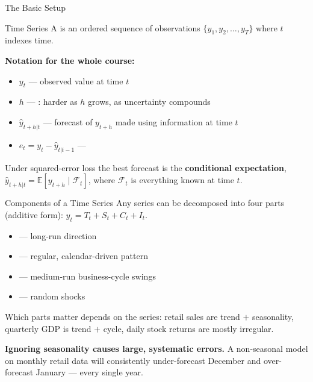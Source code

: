 \documentclass[aspectratio=169, 11pt]{beamer}
\begin{document}
\begin{frame}{The Basic Setup}
  \begin{definitionbox}{Time Series}
    A  is an ordered sequence of observations
    $\{y_1, y_2, \ldots, y_T\}$ where $t$ indexes time.
  \end{definitionbox}
  \textbf{Notation for the whole course:}
  \begin{itemize}\small\itemsep1pt
    \item $y_t$ --- observed value at time $t$
    \item $h$ --- : harder as $h$ grows, as uncertainty compounds
    \item $\hat{y}_{t+h|t}$ --- forecast of $y_{t+h}$ made using information at time $t$
    \item $e_t = y_t - \hat{y}_{t|t-1}$ --- 
  \end{itemize}
  \vspace{0.15cm}
  Under squared-error loss the best forecast is the \textbf{conditional
  expectation}, $\hat{y}_{t+h|t} = \mathbb{E}[y_{t+h} \mid \mathcal{F}_t]$,
  where $\mathcal{F}_t$ is everything known at time $t$.
\end{frame}

\begin{frame}{Components of a Time Series}
  Any series can be decomposed into four parts (additive form):
  $y_t = T_t + S_t + C_t + I_t$.
  \begin{itemize}\small\itemsep1pt
    \item {} --- long-run direction
    \item {} --- regular, calendar-driven pattern
    \item {} --- medium-run business-cycle swings
    \item {} --- random shocks
  \end{itemize}
  Which parts matter depends on the series: retail sales are trend $+$
  seasonality, quarterly GDP is trend $+$ cycle, daily stock returns are
  mostly irregular.
  \begin{warningbox}
    \textbf{Ignoring seasonality causes large, systematic errors.}
    A non-seasonal model on monthly retail data will consistently
    under-forecast December and over-forecast January --- every single year.
  \end{warningbox}
\end{frame}
\end{document}
